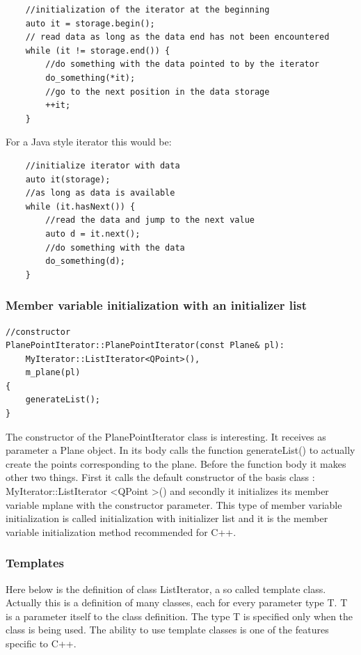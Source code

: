 \documentclass{article}
\begin{document}
\begin{lstlisting}
	//initialization of the iterator at the beginning
	auto it = storage.begin();    
	// read data as long as the data end has not been encountered	
	while (it != storage.end()) {  
		//do something with the data pointed to by the iterator		
		do_something(*it);   
		//go to the next position in the data storage 
   		++it;   
	}
\end{lstlisting}

For a Java style iterator this would be:

\begin{lstlisting}
	//initialize iterator with data	
	auto it(storage);     
	//as long as data is available    
	while (it.hasNext()) { 
		//read the data and jump to the next value
		auto d = it.next();  
		//do something with the data
        do_something(d);  
    }
\end{lstlisting}
\subsubsection {Member variable initialization with an initializer list}

\begin{lstlisting}
//constructor
PlanePointIterator::PlanePointIterator(const Plane& pl):
    MyIterator::ListIterator<QPoint>(),
    m_plane(pl)
{
    generateList();
}
\end{lstlisting}

The constructor of the PlanePointIterator class is interesting. It receives as parameter a Plane object. In its body calls the function generateList() to actually create the points corresponding to the plane. Before the function body it makes other two things. First it calls the default constructor of the basis class : MyIterator::ListIterator \textless QPoint \textgreater() and secondly it initializes its member variable m\textunderscore plane with the constructor parameter. This type of member variable initialization is called initialization with initializer list and it is the member variable initialization method recommended for C++. 

\subsubsection {Templates}

Here below is the definition of class ListIterator, a so called template class. Actually this is a definition of many classes, each for every parameter type T. T is a parameter itself to the class definition. The type T is specified only when the class is being used. The ability to use template classes is one of the features specific to C++.
\end{document}
